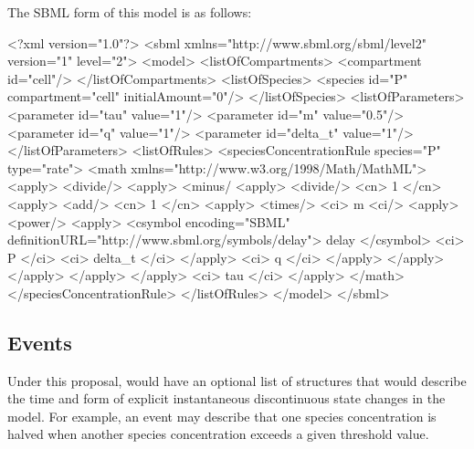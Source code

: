 \documentclass[10pt,twocolumntoc]{cekarticle}
\begin{document}
The SBML form of this model is as follows:
\begin{example}
<?xml version="1.0"?>
<sbml xmlns="http://www.sbml.org/sbml/level2" version="1" level="2">
    <model>
        <listOfCompartments>
            <compartment id="cell"/>
        </listOfCompartments>
        <listOfSpecies>
            <species id="P" compartment="cell" initialAmount="0"/>
        </listOfSpecies>
        <listOfParameters>
            <parameter id="tau" value="1"/>
            <parameter id="m" value="0.5"/>
            <parameter id="q" value="1"/>
            <parameter id="delta_t" value="1"/>
        </listOfParameters>
        <listOfRules>
            <speciesConcentrationRule species="P" type="rate">
                <math xmlns="http://www.w3.org/1998/Math/MathML">
                 <apply>
                  <divide/>
                  <apply>
                   <minus/
                   <apply>
                    <divide/>
                    <cn> 1 </cn>
                    <apply>
                     <add/>
                     <cn> 1 </cn>
                     <apply>
                      <times/>
                      <ci> m <ci/>
                      <apply>
                       <power/>
                       <apply>
                        <csymbol encoding="SBML"
definitionURL="http://www.sbml.org/symbols/delay">
                            delay
                        </csymbol>
                        <ci> P </ci>
                        <ci> delta_t </ci>
                       </apply>
                       <ci> q </ci>
                      </apply>
                     </apply>
                    </apply>
                   </apply>
                  </apply>
                  <ci> tau </ci>
                 </apply>
                </math>
            </speciesConcentrationRule>
        </listOfRules>
    </model>
</sbml>
\end{example}

\subsection{Events}
\label{sec:events}

Under this proposal,  would have an optional list of
 structures that would describe the time and form of explicit
instantaneous discontinuous state changes in the model.  For example, an
event may describe that one species concentration is halved when another
species concentration exceeds a given threshold value.
\end{document}
